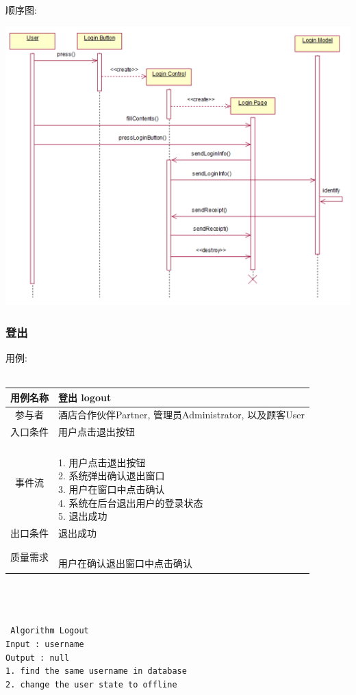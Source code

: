 \documentclass[11pt]{article}
\begin{document}
			顺序图: 
			\begin{center}
			\includegraphics[scale=0.42]{登录_顺序图.png}
			\end{center}

		
		\subsubsection{登出}
			用例: \\ \\
			\begin{tabular}{c|l}
			\hline
			用例名称 & 登出 logout \\ \hline
			参与者 & 酒店合作伙伴Partner, 管理员Administrator, 以及顾客User  \\ \hline
			入口条件 & 用户点击退出按钮 \\ \hline
			事件流 & 	\parbox{33em}{\ \\
						1. 用户点击退出按钮 \\
						2. 系统弹出确认退出窗口 \\
						3. 用户在窗口中点击确认  \\
						4. 系统在后台退出用户的登录状态 \\
						5. 退出成功 \\
						} \\ \hline
			出口条件 & 退出成功 \\ \hline
			质量需求 & \parbox{33em}{\ \\
						用户在确认退出窗口中点击确认 \\
						} \\ \hline
			\end{tabular}\\ \\ \\
			\texttt{
			Algorithm Logout \\
			Input : username \\
			Output : null \\
			1. find the same username in database \\
			2. change the user state to offline \\
			} \\
			
\end{document}

